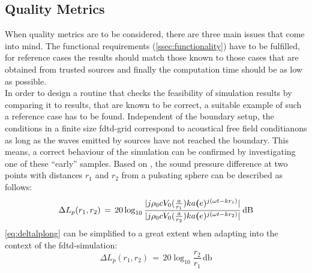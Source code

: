 \subsection{Quality Metrics}\label{ssec:qmetrics}
When quality metrics are to be considered, there are three main issues that come into mind. The functional requirements (\autoref{ssec:functionality}) have to be fulfilled, for reference cases the results should match those known to those cases that are obtained from trusted sources and finally the computation time should be as low as possible.\\
In order to design a routine that checks the feasibility of simulation results by comparing it to results, that are known to be correct, a suitable example of such a reference case has to be found. Independent of the boundary setup, the conditions in a finite size \gls{fdtd}-grid correspond to acoustical free field conditianons as long as the waves emitted by sources have not reached the boundary. This means, a correct behaviour of the simulation can be confirmed by investigating one of these ``early'' samples. Based on \citep[p. 172]{kinsler2000}, the sound pressure difference at two points with distances $r_1$ and $r_2$ from a pulsating sphere can be described as follows:
\begin{equation}\label{eq:deltalplong}
\Delta L_{p}(r_1,r_2)\,=\,20\log_{10}\frac{|j\rho_0 c V_0(\frac{a}{r_1})ka \textbf(e)^{j(\omega t-kr_1)}|}{|j\rho_0 c V_0(\frac{a}{r_2})ka \textbf(e)^{j(\omega t-kr_2)}|}\,\si{\decibel}
\end{equation}
\startexplain
{}
\stopexplain
\autoref{eq:deltalplong} can be simplified to a great extent when adapting into the context of the \gls{fdtd}-simulation:
\begin{equation}\label{eq:deltalpshort}
\Delta L_{p}(r_1,r_2)\,=\,20\log_{10}\frac{r_2}{r_1}\,\si{\decibel}
\end{equation}
